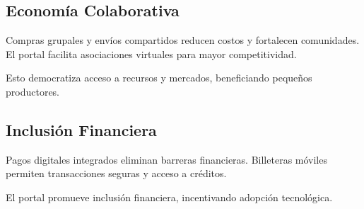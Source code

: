 \subsection{Economía Colaborativa}
Compras grupales y envíos compartidos reducen costos y fortalecen comunidades. El portal facilita asociaciones virtuales para mayor competitividad.

Esto democratiza acceso a recursos y mercados, beneficiando pequeños productores.

\subsection{Inclusión Financiera}
Pagos digitales integrados eliminan barreras financieras. Billeteras móviles permiten transacciones seguras y acceso a créditos.

El portal promueve inclusión financiera, incentivando adopción tecnológica.